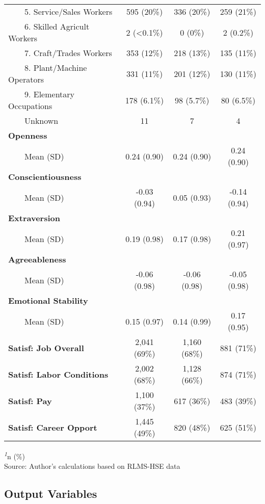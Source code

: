\documentclass[
]{interact}
\begin{document}
\begin{table}
{\begin{tabular*}{\linewidth}{@{\extracolsep{\fill}}lccc}
    5. Service/Sales Workers & 595 (20\%) & 336 (20\%) & 259 (21\%) \\ 
    6. Skilled Agricult Workers & 2 (<0.1\%) & 0 (0\%) & 2 (0.2\%) \\ 
    7. Craft/Trades Workers & 353 (12\%) & 218 (13\%) & 135 (11\%) \\ 
    8. Plant/Machine Operators & 331 (11\%) & 201 (12\%) & 130 (11\%) \\ 
    9. Elementary Occupations & 178 (6.1\%) & 98 (5.7\%) & 80 (6.5\%) \\ 
    Unknown & 11 & 7 & 4 \\ 
{\bfseries Openness} &  &  &  \\ 
    Mean (SD) & 0.24 (0.90) & 0.24 (0.90) & 0.24 (0.90) \\ 
{\bfseries Conscientiousness} &  &  &  \\ 
    Mean (SD) & -0.03 (0.94) & 0.05 (0.93) & -0.14 (0.94) \\ 
{\bfseries Extraversion} &  &  &  \\ 
    Mean (SD) & 0.19 (0.98) & 0.17 (0.98) & 0.21 (0.97) \\ 
{\bfseries Agreeableness} &  &  &  \\ 
    Mean (SD) & -0.06 (0.98) & -0.06 (0.98) & -0.05 (0.98) \\ 
{\bfseries Emotional Stability} &  &  &  \\ 
    Mean (SD) & 0.15 (0.97) & 0.14 (0.99) & 0.17 (0.95) \\ 
{\bfseries Satisf: Job Overall} & 2,041 (69\%) & 1,160 (68\%) & 881 (71\%) \\ 
{\bfseries Satisf: Labor Conditions} & 2,002 (68\%) & 1,128 (66\%) & 874 (71\%) \\ 
{\bfseries Satisf: Pay} & 1,100 (37\%) & 617 (36\%) & 483 (39\%) \\ 
{\bfseries Satisf: Career Opport} & 1,445 (49\%) & 820 (48\%) & 625 (51\%) \\ 
\bottomrule
\end{tabular*}
\begin{minipage}{\linewidth}
\textsuperscript{\textit{1}}n (\%)\\
Source: Author's calculations based on RLMS-HSE data\\
\end{minipage}

}

\end{table}%

\subsection{Output Variables}\label{output-variables}
\end{document}
